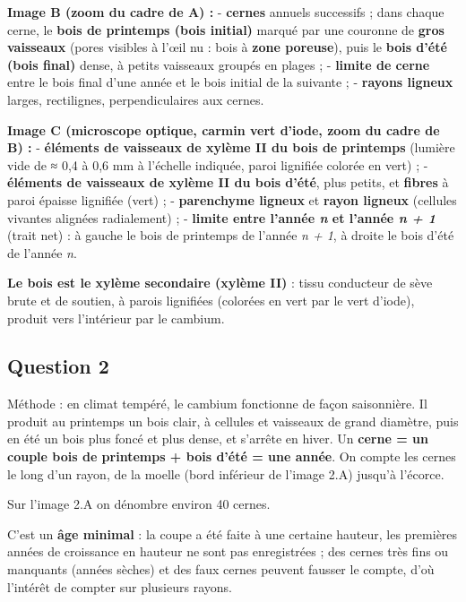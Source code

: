 \documentclass[11pt,a4paper]{article}
\newcommand{\equationajustee}[1]{%
  \sbox{\boiteequation}{$\displaystyle #1$}%
  \ifdim\wd\boiteequation>\linewidth
    \[\resizebox{\linewidth}{!}{\usebox{\boiteequation}}\]%
  \else
    \[#1\]%
  \fi}
\begin{document}
\textbf{Image B (zoom du cadre de A) :}
- \textbf{cernes} annuels successifs ; dans chaque cerne, le \textbf{bois de printemps (bois initial)} marqué par une couronne de \textbf{gros vaisseaux} (pores visibles à l'œil nu : bois à \textbf{zone poreuse}), puis le \textbf{bois d'été (bois final)} dense, à petits vaisseaux groupés en plages ;
- \textbf{limite de cerne} entre le bois final d'une année et le bois initial de la suivante ;
- \textbf{rayons ligneux} larges, rectilignes, perpendiculaires aux cernes.

\textbf{Image C (microscope optique, carmin vert d'iode, zoom du cadre de B) :}
- \textbf{éléments de vaisseaux de xylème II du bois de printemps} (lumière vide de ≈ 0,4 à 0,6 mm à l'échelle indiquée, paroi lignifiée colorée en vert) ;
- \textbf{éléments de vaisseaux de xylème II du bois d'été}, plus petits, et \textbf{fibres} à paroi épaisse lignifiée (vert) ;
- \textbf{parenchyme ligneux} et \textbf{rayon ligneux} (cellules vivantes alignées radialement) ;
- \textbf{limite entre l'année \emph{n} et l'année \emph{n + 1}} (trait net) : à gauche le bois de printemps de l'année \emph{n + 1}, à droite le bois d'été de l'année \emph{n}.

\textbf{Le bois est le xylème secondaire (xylème II)} : tissu conducteur de sève brute et de soutien, à parois lignifiées (colorées en vert par le vert d'iode), produit vers l'intérieur par le cambium.

\hypertarget{question-2}{%
\subsection{Question 2}\label{question-2}}

Méthode : en climat tempéré, le cambium fonctionne de façon saisonnière. Il produit au printemps un bois clair, à cellules et vaisseaux de grand diamètre, puis en été un bois plus foncé et plus dense, et s'arrête en hiver. Un \textbf{cerne = un couple bois de printemps + bois d'été = une année}. On compte les cernes le long d'un rayon, de la moelle (bord inférieur de l'image 2.A) jusqu'à l'écorce.

Sur l'image 2.A on dénombre environ 40 cernes.

\equationajustee{\boxed{\text{\text{âge}} \approx 40\ \text{ans (35 \text{à} 45 ans)}}}

C'est un \textbf{âge minimal} : la coupe a été faite à une certaine hauteur, les premières années de croissance en hauteur ne sont pas enregistrées ; des cernes très fins ou manquants (années sèches) et des faux cernes peuvent fausser le compte, d'où l'intérêt de compter sur plusieurs rayons.
\end{document}
